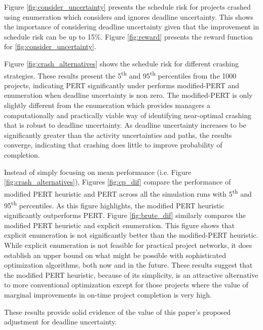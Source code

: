 \documentclass[11pt]{article}
\begin{document}
Figure \ref{fig:consider_uncertainty} presents the schedule risk for projects crashed using enumeration which considers and ignores deadline uncertainty. This shows the importance of considering deadline uncertainty given that the improvement in schedule risk can be up to 15\%. Figure \ref{fig:reward} presents the reward function for \ref{fig:consider_uncertainty}. 

Figure \ref{fig:crash_alternatives} shows the schedule risk for different crashing strategies. These results present the 5\textsuperscript{th} and 95\textsuperscript{th} percentiles from the 1000 projects, indicating PERT significantly under performs modified-PERT and enumeration when deadline uncertainty is non zero. The modified-PERT is only slightly different from the enumeration which provides managers a computationally and practically viable way of identifying near-optimal crashing that is robust to deadline uncertainty. As deadline uncertainty increases to be significantly greater than the activity uncertainties and paths, the results converge, indicating that crashing does little to improve probability of completion. 
    
Instead of simply focusing on mean performance (i.e. Figure \ref{fig:crash_alternatives}), Figures \ref{fig:cp_dif} compare the performance of modified PERT heuristic and PERT across all the simulation runs with 5\textsuperscript{th} and 95\textsuperscript{th} percentiles.  As this figure highlights, the modified PERT heuristic significantly outperforms PERT. Figure \ref{fig:brute_dif} similarly compares the modified PERT heuristic and explicit enumeration.   This figure shows that explicit enumeration is not significantly better than the modified-PERT heuristic. 
While explicit enumeration is not feasible for practical project networks, it does establish an upper bound on what might be possible with sophisticated optimization algorithms, both now and in the future.  These results suggest that the modified PERT heuristic, because of its simplicity, is an attractive alternative to more conventional optimization except for those projects where the value of marginal improvements in on-time project completion is very high. 

These results provide solid evidence of the value of this paper's proposed adjustment for deadline uncertainty.
\end{document}
